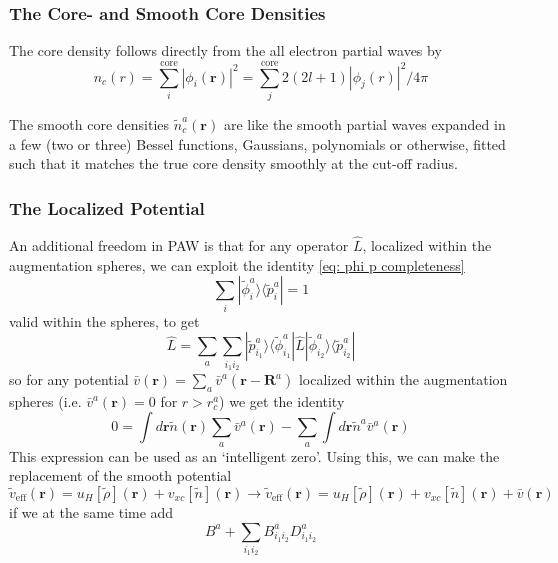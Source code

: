 \documentclass[a4paper]{article}
\newcommand{\f}[1]{\mathbf{#1}}
\newcommand{\s}[1]{\tilde{#1}}
\newcommand{\wh}[1]{\widehat{#1}}
\newcommand{\br}{\mathbf{r}}
\newcommand{\bR}{\mathbf{R}}
\newcommand{\bra}[1]{\langle #1 |}
\newcommand{\ket}[1]{| #1 \rangle}
\begin{document}
\subsubsection*{The Core- and Smooth Core Densities }
The core density follows directly from the all electron partial waves by
%
\begin{equation}\label{eq: core density}
n_c(r) = \sum_i^\text{core} |\phi_i(\br)|^2 = \sum_j^\text{core} 2(2l+1) |\phi_j(r)|^2 / 4\pi
\end{equation}
%
\par The smooth core densities $\s{n}_c^a(\br)$ are like the smooth
partial waves expanded in a few (two or three) Bessel functions,
Gaussians, polynomials or otherwise, fitted such that it matches the
true core density smoothly at the cut-off radius.

\subsubsection*{The Localized Potential}
An additional freedom in PAW is that for any operator $\wh{L}$,
localized within the augmentation spheres, we can exploit the identity
\ref{eq: phi p completeness}
%
\begin{equation}
\sum_i \ket{\s{\phi}_i^a}\bra{\s{p}_i^a} = 1 %
\end{equation}
%
valid within the spheres, to get
%
\begin{equation*}
  \wh{L} = \sum_a \sum_{i_1i_2} \ket{\s{p}^a_{i_1}}\bra{\s{\phi}_{i_1}^a}\wh{L} \ket{\s{\phi}_{i_2}^a}\bra{\s{p}^a_{i_2}}
\end{equation*}
%
so for any potential $\bar{v}(\br) = \sum_a \bar{v}^a(\br- \bR^a)$
localized within the augmentation spheres (i.e. $\bar{v}^a(\br) = 0$
for $r>r_c^a$) we get the identity
%
\begin{equation*}
  0 = \int d\br \s{n}(\br) \sum_a \bar{v}^a(\br) - \sum_a \int d\br \s{n}^a \bar{v}^a(\br)
\end{equation*}
%
This expression can be used as an `intelligent zero'. Using this, we
can make the replacement of the smooth potential
%
\begin{equation}
  \s{v}_\text{eff}(\br) = u_H[\s{\rho}](\br) + v_{xc}[\s{n}](\br) \to \s{v}_\text{eff}(\br) = u_H[\s{\rho}](\br) + v_{xc}[\s{n}](\br) + \bar{v}(\br)
\end{equation}
%
if we at the same time add
%
\begin{equation}
  B^a + \sum_{i_1i_2} B^a_{i_1i_2} D^a_{i_1i_2}
\end{equation}
\end{document}
